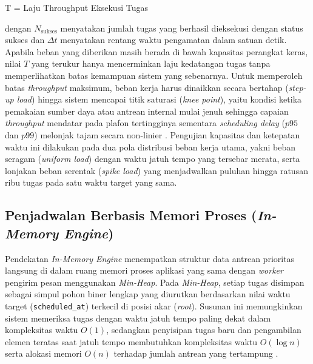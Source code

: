 \begin{equationcaptioned}[eq:2.throughput]{
    T = 
}{
    Laju Throughput Eksekusi Tugas
}
\end{equationcaptioned}

\noindent dengan $N_{\text{sukses}}$ menyatakan jumlah tugas yang berhasil dieksekusi dengan status sukses dan $\Delta t$ menyatakan rentang waktu pengamatan dalam satuan detik. Apabila beban yang diberikan masih berada di bawah kapasitas perangkat keras, nilai $T$ yang terukur hanya mencerminkan laju kedatangan tugas tanpa memperlihatkan batas kemampuan sistem yang sebenarnya. Untuk memperoleh batas \textit{throughput} maksimum, beban kerja harus dinaikkan secara bertahap (\textit{step-up load}) hingga sistem mencapai titik saturasi (\textit{knee point}), yaitu kondisi ketika pemakaian sumber daya atau antrean internal mulai jenuh sehingga capaian \textit{throughput} mendatar pada plafon tertingginya sementara \textit{scheduling delay} ($p95$ dan $p99$) melonjak tajam secara non-linier \cite{gregg2020systems, kleppmann2026designing}. Pengujian kapasitas dan ketepatan waktu ini dilakukan pada dua pola distribusi beban kerja utama, yakni beban seragam (\textit{uniform load}) dengan waktu jatuh tempo yang tersebar merata, serta lonjakan beban serentak (\textit{spike load}) yang menjadwalkan puluhan hingga ratusan ribu tugas pada satu waktu target yang sama. \par

\subsection{Penjadwalan Berbasis Memori Proses (\textit{In-Memory Engine})} \label{II.Teori_InMemory}
Pendekatan \textit{In-Memory Engine} menempatkan struktur data antrean prioritas langsung di dalam ruang memori proses aplikasi yang sama dengan \textit{worker} pengirim pesan menggunakan \textit{Min-Heap}. Pada \textit{Min-Heap}, setiap tugas disimpan sebagai simpul pohon biner lengkap yang diurutkan berdasarkan nilai waktu target (\texttt{scheduled\_at}) terkecil di posisi akar (\textit{root}). Susunan ini memungkinkan sistem memeriksa tugas dengan waktu jatuh tempo paling dekat dalam kompleksitas waktu $O(1)$, sedangkan penyisipan tugas baru dan pengambilan elemen teratas saat jatuh tempo membutuhkan kompleksitas waktu $O(\log n)$ serta alokasi memori $O(n)$ terhadap jumlah antrean yang tertampung \cite{cormen2022introduction}. \par

